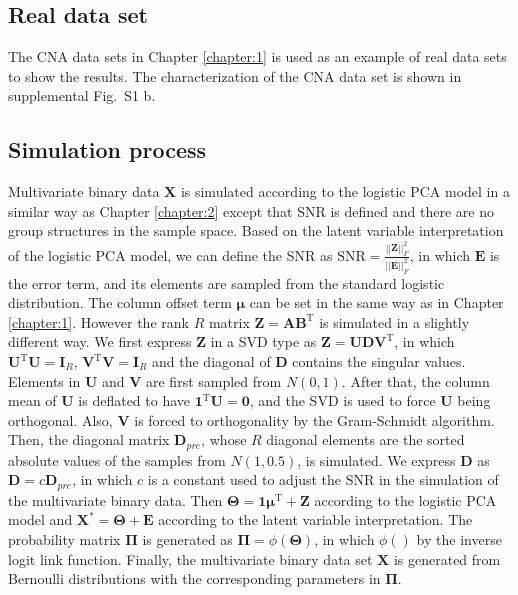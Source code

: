 \subsection{Real data set}
The CNA data sets in Chapter \ref{chapter:1} is used as an example of real data sets to show the results. The characterization of the CNA data set is shown in supplemental Fig.~S1 b.

\subsection{Simulation process}
Multivariate binary data $\mathbf{X}$ is simulated according to the logistic PCA model in a similar way as Chapter \ref{chapter:2} except that SNR is defined and there are no group structures in the sample space. Based on the latent variable interpretation of the logistic PCA model, we can define the SNR as $\text{SNR}=\frac{||\mathbf{Z}||_F^2}{||\mathbf{E}||_F^2}$, in which $\mathbf{E}$ is the error term, and its elements are sampled from the standard logistic distribution. The column offset term $\bm{\mu}$ can be set in the same way as in Chapter \ref{chapter:1}. However the rank $R$ matrix $\mathbf{Z}=\mathbf{AB}^{\text{T}}$ is simulated in a slightly different way. We first express $\mathbf{Z}$ in a SVD type as $\mathbf{Z}= \mathbf{UDV}^{\text{T}}$, in which $\mathbf{U}^{\text{T}}\mathbf{U} = \mathbf{I}_{R}$, $\mathbf{V}^{\text{T}}\mathbf{V} = \mathbf{I}_{R}$ and the diagonal of $\mathbf{D}$ contains the singular values. Elements in $\mathbf{U}$ and $\mathbf{V}$ are first sampled from $N(0,1)$. After that, the column mean of $\mathbf{U}$ is deflated to have $\mathbf{1}^{\text{T}}\mathbf{U}=\mathbf{0}$, and the SVD is used to force $\mathbf{U}$ being orthogonal. Also, $\mathbf{V}$ is forced to orthogonality by the Gram-Schmidt algorithm. Then, the diagonal matrix $\mathbf{D}_{pre}$, whose $R$ diagonal elements are the sorted absolute values of the samples from $N(1,0.5)$, is simulated. We express $\mathbf{D}$ as $\mathbf{D} = c\mathbf{D}_{pre}$, in which $c$ is a constant used to adjust the SNR in the simulation of the multivariate binary data. Then $\mathbf{\Theta} = \mathbf{1}\bm{\mu}^{\text{T}} + \mathbf{Z}$ according to the logistic PCA model and $\mathbf{X}^{\ast} = \mathbf{\Theta} + \mathbf{E}$ according to the latent variable interpretation. The probability matrix $\mathbf{\Pi}$ is generated as $\mathbf{\Pi} = \phi(\mathbf{\Theta})$, in which $\phi()$ by the inverse logit link function. Finally, the multivariate binary data set $\mathbf{X}$ is generated from Bernoulli distributions with the corresponding parameters in $\mathbf{\Pi}$.

